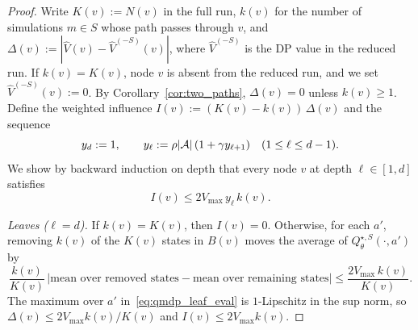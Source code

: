 \begin{proof}
Write $K(v):=N(v)$ in the full run, $k(v)$ for the number of simulations $m\in S$ whose path passes through $v$, and $\Delta(v):=|\hat V(v)-\hat V^{(-S)}(v)|$, where $\hat V^{(-S)}$ is the DP value in the reduced run.
If $k(v)=K(v)$, node $v$ is absent from the reduced run, and we set $\hat V^{(-S)}(v):=0$.
By Corollary~\ref{cor:two_paths}, $\Delta(v)=0$ unless $k(v)\ge1$.
Define the weighted influence $I(v):=(K(v)-k(v))\,\Delta(v)$ and the sequence
\[
y_d:=1,\qquad y_\ell:=\rho|{\mathcal{A}}|\,(1+\gamma y_{\ell+1})\quad(1\le\ell\le d-1).
\]
We show by backward induction on depth that every node $v$ at depth $\ell\in[1,d]$ satisfies
\begin{equation}\label{eq:influence_induction}
I(v)\le 2V_{\max}\,y_\ell\,k(v).
\end{equation}

\emph{Leaves ($\ell=d$).}
If $k(v)=K(v)$, then $I(v)=0$.
Otherwise, for each $a'$, removing $k(v)$ of the $K(v)$ states in $B(v)$ moves the average of $Q_\theta^{\star,S}(\cdot,a')$ by
\[
\frac{k(v)}{K(v)}\,\bigl|\text{mean over removed states}-\text{mean over remaining states}\bigr|\le\frac{2V_{\max}\,k(v)}{K(v)}.
\]
The maximum over $a'$ in~\eqref{eq:qmdp_leaf_eval} is $1$-Lipschitz in the sup norm, so $\Delta(v)\le 2V_{\max}k(v)/K(v)$ and $I(v)\le 2V_{\max}k(v)$.


\end{proof}
